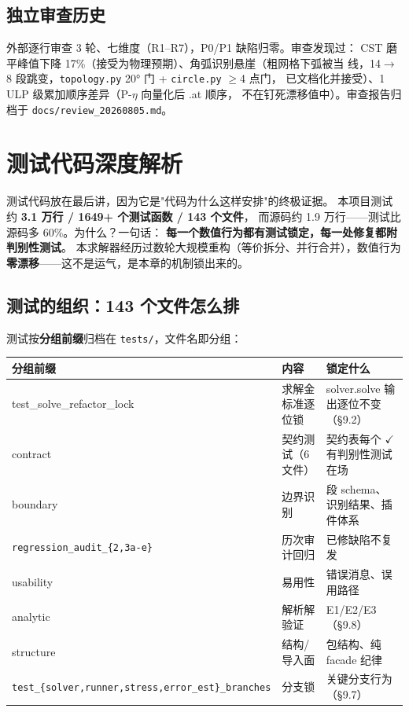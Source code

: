 \documentclass[12pt,a4paper]{ctexart}
\newcommand{\fem}{\Verb}
\begin{document}
\subsection{独立审查历史}

外部逐行审查 3 轮、七维度（R1--R7），P0/P1 缺陷归零。审查发现过：
CST 磨平峰值下降 17\%（接受为物理预期）、角弧识别悬崖（粗网格下弧被当
线，14$\to$8 段跳变，\fem|topology.py| 20° 门 + \fem|circle.py| $\ge$4 点门，
已文档化并接受）、1 ULP 级累加顺序差异（P-$\eta$ 向量化后 .at 顺序，
不在钉死漂移值中）。审查报告归档于 \fem|docs/review_20260805.md|。

\section{测试代码深度解析}

测试代码放在最后讲，因为它是"代码为什么这样安排"的终极证据。
本项目测试约 \textbf{3.1 万行 / 1649+ 个测试函数 / 143 个文件}，
而源码约 1.9 万行——测试比源码多 60\%。为什么？一句话：
\textbf{每一个数值行为都有测试锁定，每一处修复都附判别性测试}。
本求解器经历过数轮大规模重构（等价拆分、并行合并），数值行为
\textbf{零漂移}——这不是运气，是本章的机制锁出来的。

\subsection{测试的组织：143 个文件怎么排}

测试按\textbf{分组前缀}归档在 \fem|tests/|，文件名即分组：

\begin{table}[h]
\centering
\small
\begin{tabular}{p{5.6cm}p{4.2cm}p{4.4cm}}
\toprule
\textbf{分组前缀} & \textbf{内容} & \textbf{锁定什么} \\
\midrule
test\_solve\_refactor\_lock & 求解金标准逐位锁 & solver.solve 输出逐位不变（§9.2） \\
contract & 契约测试（6 文件） & 契约表每个 $\checkmark$ 有判别性测试在场 \\
boundary & 边界识别 & 段 schema、识别结果、插件体系 \\
\texttt{regression\_audit\_\newline 2026080\{2,3a-e\}} & 历次审计回归 & 已修缺陷不复发 \\
usability & 易用性 & 错误消息、误用路径 \\
analytic & 解析解验证 & E1/E2/E3（§9.8） \\
structure & 结构/导入面 & 包结构、纯 facade 纪律 \\
\texttt{test\_\{solver,runner,\newline stress,error\_est\}\_\newline branches} & 分支锁 & 关键分支行为（§9.7） \\
\bottomrule
\end{tabular}
\end{table}
\end{document}
